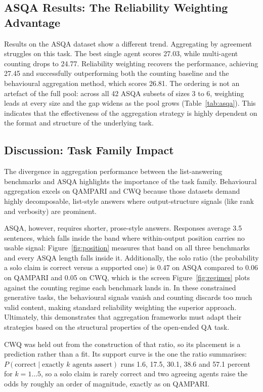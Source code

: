 \documentclass{article}
\begin{document}
\subsection{ASQA Results: The Reliability Weighting Advantage}
\label{sec:rq3}


Results on the ASQA dataset show a different trend. Aggregating by agreement struggles on this task. The best single agent scores 27.03, while multi-agent counting drops to 24.77. Reliability weighting recovers the performance, achieving 27.45 and successfully outperforming both the counting baseline and the behavioural aggregation method, which scores 26.81. The ordering is not an artefact of the full pool: across all 42 ASQA subsets of sizes 3 to 6, weighting leads at every size and the gap widens as the pool grows (Table~\ref{tab:asqa}). This indicates that the effectiveness of the aggregation strategy is highly dependent on the format and structure of the underlying task.

\subsection{Discussion: Task Family Impact}

The divergence in aggregation performance between the list-answering benchmarks and ASQA highlights the importance of the task family. Behavioural aggregation excels on QAMPARI and CWQ because those datasets demand highly decomposable, list-style answers where output-structure signals (like rank and verbosity) are prominent.

ASQA, however, requires shorter, prose-style answers. Responses average 3.5 sentences, which falls inside the band where within-output position carries no usable signal: Figure~\ref{fig:position} measures that band on all three benchmarks and every ASQA length falls inside it. Additionally, the solo ratio (the probability a solo claim is correct versus a supported one) is 0.47 on ASQA compared to 0.06 on QAMPARI and 0.05 on CWQ, which is the screen Figure~\ref{fig:regimes} plots against the counting regime each benchmark lands in. In these constrained generative tasks, the behavioural signals vanish and counting discards too much valid content, making standard reliability weighting the superior approach. Ultimately, this demonstrates that aggregation frameworks must adapt their strategies based on the structural properties of the open-ended QA task.

CWQ was held out from the construction of that ratio, so its placement is a prediction rather than a fit. Its support curve is the one the ratio summarises: $P(\mathrm{correct} \mid \text{exactly } k \text{ agents assert})$ runs 1.6, 17.5, 30.1, 38.6 and 57.1 percent for $k = 1 \dots 5$, so a solo claim is rarely correct and two agreeing agents raise the odds by roughly an order of magnitude, exactly as on QAMPARI.
\end{document}
